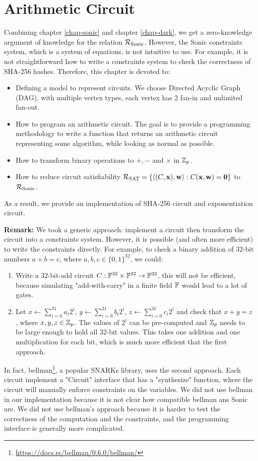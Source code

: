 \chapter{Arithmetic Circuit}
\label{chap-circuit}

Combining chapter \ref{chap-sonic} and chapter \ref{chap-dark}, we get a zero-knowledge argument of knowledge for the relation $\mathcal{R}_{\mathrm{Sonic}}$. However, the Sonic constraints system, which is a system of equations, is not intuitive to use. For example, it is not straightforward how to write a constraints system to check the correctness of SHA-256 hashes. Therefore, this chapter is devoted to:
\begin{itemize}
    \item Defining a model to represent circuits. We choose Directed Acyclic Graph (DAG), with multiple vertex types, each vertex has 2 fan-in and unlimited fan-out.
    \item How to program an arithmetic circuit. The goal is to provide a programming methodology to write a function that returns an arithmetic circuit representing some algorithm, while looking as normal as possible.
    \item How to transform binary operations to $+, -$ and $\times$ in $\mathbb{Z}_p$.
    \item How to reduce circuit satisfiability $\mathcal{R}_{\mathrm{SAT}} = \{\langle (C, \mathbf{x}), \mathbf{w} \rangle : C(\mathbf{x}, \mathbf{w}) = \mathbf{0}\}$ to $\mathcal{R}_{\mathrm{Sonic}}$.
\end{itemize}

As a result, we provide an implementation of SHA-256 circuit and exponentiation circuit.

\textbf{Remark:} We took a generic approach: implement a circuit then transform the circuit into a constraints system. However, it is possible (and often more efficient) to write the constraints directly. For example, to check a binary addition of 32-bit numbers $a + b = c$, where $a, b, c \in \{0, 1\}^{32}$, we could:
\begin{enumerate}
    \item Write a 32-bit-add circuit $C: \mathbb{F}^{32} \times \mathbb{F}^{32} \to \mathbb{F}^{32}$, this will not be efficient, because simulating "add-with-carry" in a finite field $\mathbb{F}$ would lead to a lot of gates.
    \item Let $x \gets \sum_{i=0}^{31} a_i 2^i$, $y \gets \sum_{i=0}^{31} b_i 2^i$, $z \gets \sum_{i=0}^{31} c_i 2^i$ and check that $x + y = z$, where $x, y, z \in \mathbb{Z}_p$. The values of $2^i$ can be pre-computed and $\mathbb{Z}_p$ needs to be large enough to hold all 32-bit values. This takes one addition and one multiplication for each bit, which is much more efficient that the first approach.
\end{enumerate}
In fact, bellman\footnote{\url{https://docs.rs/bellman/0.6.0/bellman/}}, a popular SNARKs library, uses the second approach. Each circuit implement a "Circuit" interface that has a "synthesize" function, where the circuit will manually enforce constraints on the variables. We did not use bellman in our implementation because it is not clear how compatible bellman ans Sonic are. We did not use bellman's approach because it is harder to test the correctness of the computation and the constraints, and the programming interface is generally more complicated.


